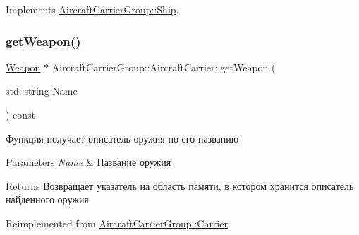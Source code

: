 Implements \mbox{\hyperlink{class_aircraft_carrier_group_1_1_ship_a6455eb63c95dd3598b45b92e42e7f84d}{Aircraft\+Carrier\+Group\+::\+Ship}}.

\mbox{\label{class_aircraft_carrier_group_1_1_aircraft_carrier_aa7839178084e4f749592e02d2d8e93a4}} 
\subsubsection{\texorpdfstring{get\+Weapon()}{getWeapon()}}
{\footnotesize\ttfamily \mbox{\hyperlink{class_aircraft_carrier_group_1_1_weapon}{Weapon}} $\ast$ Aircraft\+Carrier\+Group\+::\+Aircraft\+Carrier\+::get\+Weapon (\begin{DoxyParamCaption}\item[{std\+::string}]{Name }\end{DoxyParamCaption}) const\hspace{0.3cm}{\ttfamily [virtual]}}



Функция получает описатель оружия по его названию 


\begin{DoxyParams}{Parameters}
{\em Name} & Название оружия \\
\hline
\end{DoxyParams}
\begin{DoxyReturn}{Returns}
Возвращает указатель на область памяти, в котором хранится описатель найденного оружия 
\end{DoxyReturn}


Reimplemented from \mbox{\hyperlink{class_aircraft_carrier_group_1_1_carrier_a69e4672d2e5b0e7ff0d27e9ec762b828}{Aircraft\+Carrier\+Group\+::\+Carrier}}.

\mbox{\label{class_aircraft_carrier_group_1_1_aircraft_carrier_a36f838dfc52ea713a12ab74a2ebe237d}} 
